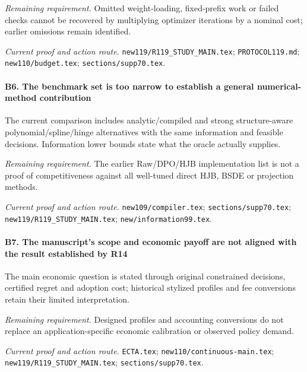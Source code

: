 \par\emph{Remaining requirement.} Omitted weight-loading, fixed-prefix work or failed checks cannot be recovered by multiplying optimizer iterations by a nominal cost; earlier omissions remain identified.

\par\emph{Current proof and action route.} \nolinkurl{new119/R119_STUDY_MAIN.tex}; \nolinkurl{PROTOCOL119.md}; \nolinkurl{new110/budget.tex}; \nolinkurl{sections/supp70.tex}.

\paragraph{B6. The benchmark set is too narrow to establish a general numerical-method contribution}

The current comparison includes analytic/\allowbreak{}compiled and strong structure-aware polynomial/\allowbreak{}spline/\allowbreak{}hinge alternatives with the same information and feasible decisions. Information lower bounds state what the oracle actually supplies.

\par\emph{Remaining requirement.} The earlier Raw/\allowbreak{}DPO/\allowbreak{}HJB implementation list is not a proof of competitiveness against all well-tuned direct HJB, BSDE or projection methods.

\par\emph{Current proof and action route.} \nolinkurl{new109/compiler.tex}; \nolinkurl{sections/supp70.tex}; \nolinkurl{new119/R119_STUDY_MAIN.tex}; \nolinkurl{new/information99.tex}.

\paragraph{B7. The manuscript's scope and economic payoff are not aligned with the result established by R14}

The main economic question is stated through original constrained decisions, certified regret and adoption cost; historical stylized profiles and fee conversions retain their limited interpretation.

\par\emph{Remaining requirement.} Designed profiles and accounting conversions do not replace an application-specific economic calibration or observed policy demand.

\par\emph{Current proof and action route.} \nolinkurl{ECTA.tex}; \nolinkurl{new110/continuous-main.tex}; \nolinkurl{new119/R119_STUDY_MAIN.tex}; \nolinkurl{sections/supp70.tex}.


